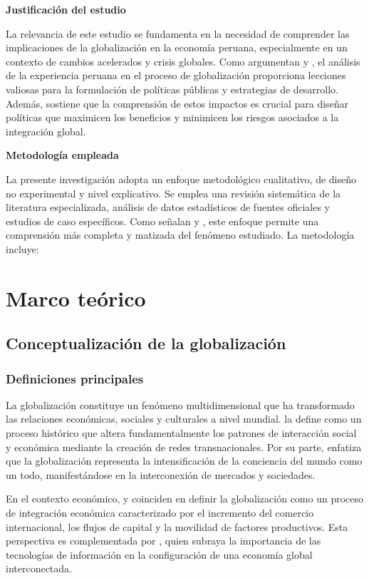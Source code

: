 \documentclass[12pt, a4paper]{article}
\begin{document}
\textbf{Justificación del estudio}  

La relevancia de este estudio se fundamenta en la necesidad de comprender las implicaciones de la globalización en la economía peruana, especialmente en un contexto de cambios acelerados y crisis globales. Como argumentan \textcite{mendoza2020} y \textcite{castillo2018}, el análisis de la experiencia peruana en el proceso de globalización proporciona lecciones valiosas para la formulación de políticas públicas y estrategias de desarrollo. Además, \textcite{seminario2019} sostiene que la comprensión de estos impactos es crucial para diseñar políticas que maximicen los beneficios y minimicen los riesgos asociados a la integración global.

\textbf{Metodología empleada}  

La presente investigación adopta un enfoque metodológico cualitativo, de diseño no experimental y nivel explicativo. Se emplea una revisión sistemática de la literatura especializada, análisis de datos estadísticos de fuentes oficiales y estudios de caso específicos. Como señalan \textcite{barrantes2021} y \textcite{lopez2020}, este enfoque permite una comprensión más completa y matizada del fenómeno estudiado. La metodología incluye:

\section{Marco teórico}

\subsection{Conceptualización de la globalización}

\subsubsection{Definiciones principales}
La globalización constituye un fenómeno multidimensional que ha transformado las relaciones económicas, sociales y culturales a nivel mundial. \textcite{held2000} la define como un proceso histórico que altera fundamentalmente los patrones de interacción social y económica mediante la creación de redes transnacionales. Por su parte, \textcite{robertson2003} enfatiza que la globalización representa la intensificación de la conciencia del mundo como un todo, manifestándose en la interconexión de mercados y sociedades.

En el contexto económico, \textcite{krugman2018} y \textcite{sassen2007} coinciden en definir la globalización como un proceso de integración económica caracterizado por el incremento del comercio internacional, los flujos de capital y la movilidad de factores productivos. Esta perspectiva es complementada por \textcite{castells2010}, quien subraya la importancia de las tecnologías de información en la configuración de una economía global interconectada.
\end{document}
